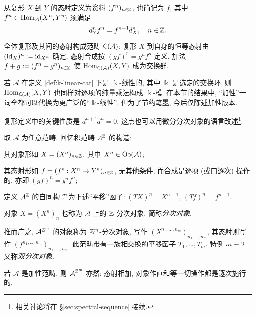 \begin{definition}\label{def:cplx-cat}
	从复形 $X$ 到 $Y$ 的态射定义为资料 $(f^n)_{n \in \mathbb{Z}}$, 也简记为 $f$, 其中 $f^n \in \operatorname{Hom}_{\mathcal{A}}(X^n, Y^n)$ 须满足
	\[ d_Y^n f^n = f^{n+1} d_X^n, \quad n \in \mathbb{Z}. \]

	全体复形及其间的态射构成范畴 $\mathsf{C}(\mathcal{A})$: 复形 $X$ 到自身的恒等态射由 $(\mathrm{id}_X)^n := \mathrm{id}_{X^n}$ 确定, 态射合成按 $(gf)^n = g^n f^n$ 定义. 加法 $f + g := (f^n + g^n)_{n \in \mathbb{Z}}$ 使 $\operatorname{Hom}_{\mathsf{C}(\mathcal{A})}(X, Y)$ 成为交换群.	
\end{definition}

若 $\mathcal{A}$ 在定义 \ref{def:k-linear-cat} 下是 $\Bbbk$-线性的, 其中 $\Bbbk$ 是选定的交换环, 则 $\operatorname{Hom}_{\mathsf{C}(\mathcal{A})}(X, Y)$ 也同样对逐项的纯量乘法构成 $\Bbbk$-模. 在本节的结果中, ``加性''一词全都可以代换为更广泛的``$\Bbbk$-线性'', 但为了节约笔墨, 今后仅陈述加性版本.

复形定义中的关键性质是 $d^{n+1} d^n = 0$, 这点也可以用微分分次对象的语言改述\footnote{相关讨论将在 \S\ref{sec:spectral-sequence} 接续.}.

\begin{definition}[分次对象]\label{def:graded-obj}
	取 $\mathcal{A}$ 为任意范畴, 回忆积范畴 $\mathcal{A}^{\mathbb{Z}}$ 的构造:
	\begin{compactitem}
		\item 其对象形如 $X = (X^n)_{n \in \mathbb{Z}}$, 其中 $X^n \in \operatorname{Ob}(\mathcal{A})$;
		\item 其态射形如 $f = (f^n: X^n \to Y^n)_{n \in \mathbb{Z}}$, 无其他条件, 而合成是逐项 (或曰逐次) 操作的, 亦即 $(gf)^n = g^n f^n$;
		\item 定义 $\mathcal{A}^{\mathbb{Z}}$ 的自同构 $T$ 为下述``平移''函子: $(TX)^n = X^{n+1}$, $(Tf)^n = f^{n+1}$.
	\end{compactitem}
	对象 $X = (X^n)_n$ 也称为 $\mathcal{A}$ 上的 $\mathbb{Z}$-分次对象, 简称\emph{分次对象}. 
	
	推而广之, $\mathcal{A}^{\mathbb{Z}^m}$ 的对象称为 $\mathbb{Z}^m$-分次对象, 写作 $(X^{n_1, \ldots, n_m})_{n_1, \ldots, n_m}$, 其态射则写作 $(f^{n_1, \ldots, n_m})_{n_1, \ldots, n_m}$. 此范畴带有一族相交换的平移函子 $T_1, \ldots, T_m$. 特例 $m=2$ 又称\emph{双分次对象}.
\end{definition}

若 $\mathcal{A}$ 是加性范畴, 则 $\mathcal{A}^{\mathbb{Z}^m}$ 亦然: 态射相加, 对象作直和等一切操作都是逐次施行的.

